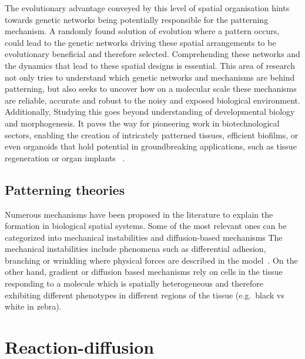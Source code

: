 The evolutionary advantage conveyed by this level of spatial organisation  hints towards genetic networks being potentially responsible for the patterning mechanism.
A randomly found solution of evolution where a pattern occurs, could lead to the genetic networks driving these spatial arrangements to be evolutionary beneficial and therefore selected.
Comprehending these networks and the dynamics that lead to these spatial designs is essential.
This area of research not only tries to understand which genetic networks and mechanisms are behind patterning, but also seeks to uncover how on a molecular scale these mechanisms are reliable, accurate and robust to the noisy and exposed biological environment.
Additionally, Studying this goes beyond understanding of developmental biology and morphogenesis.
It paves the way for pioneering work in biotechnological sectors, enabling the creation of intricately patterned tissues, efficient biofilms, or even organoids that hold potential in groundbreaking applications, such as tissue regeneration or organ implants ~\parencite{Scholes2017,Tan2018}. %



\subsection{Patterning theories}
Numerous mechanisms have been proposed in the literature to explain the formation in biological spatial systems.
Some of the most relevant ones can be categorized into mechanical instabilities and diffusion-based mechanisms %
The mechanical instabilities include phenomena such as differential adhesion, branching or wrinkling where physical forces are described in the model~\parencite{Scholes2017}.
On the other hand, gradient or diffusion based mechanisms rely on cells in the tissue responding to a molecule which is spatially heterogeneous and therefore exhibiting different phenotypes in different regions of the tissue (e.g.\ black vs white in zebra).


\section{Reaction-diffusion}
